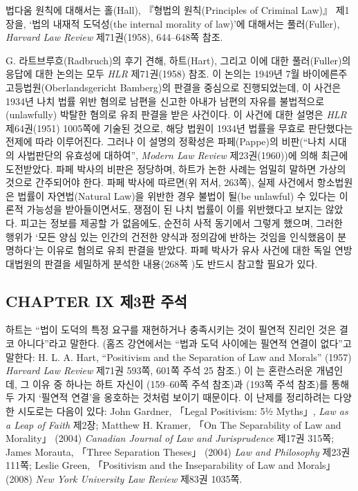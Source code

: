{
법다움 원칙에 대해서는 홀(Hall), 『형법의 원칙(Principles of Criminal
Law)』 제1장을, `법의 내재적 도덕성(the internal morality of law)'에
대해서는 풀러(Fuller), \emph{Harvard Law Review} 제71권(1958),
644--648쪽 참조.

 G.
라트브루흐(Radbruch)의 후기 견해, 하트(Hart), 그리고 이에 대한
풀러(Fuller)의 응답에 대한 논의는 모두 \emph{HLR} 제71권(1958) 참조. 이
논의는 1949년 7월 바이에른주 고등법원(Oberlandsgericht Bamberg)의 판결을
중심으로 진행되었는데, 이 사건은 1934년 나치 법률 위반 혐의로 남편을
신고한 아내가 남편의 자유를 불법적으로(unlawfully) 박탈한 혐의로 유죄 판결을 받은
사건이다. 이 사건에 대한 설명은 \emph{HLR} 제64권(1951) 1005쪽에 기술된
것으로, 해당 법원이 1934년 법률을 무효로 판단했다는 전제에 따라
이루어진다. 그러나 이 설명의 정확성은 파페(Pappe)의 비판(``나치 시대의
사법판단의 유효성에 대하여'', \emph{Modern Law Review} 제23권(1960))에
의해 최근에 도전받았다. 파페 박사의 비판은 정당하며, 하트가 논한 사례는
엄밀히 말하면 가상의 것으로 간주되어야 한다. 파페 박사에 따르면(위 저서,
263쪽), 실제 사건에서 항소법원은 법률이 자연법(Natural Law)을 위반한
경우 불법이 될(be unlawful) 수 있다는 이론적 가능성을 받아들이면서도, 쟁점이 된 나치
법률이 이를 위반했다고 보지는 않았다. 피고는 정보를 제공할
가 없음에도, 순전히 사적 동기에서 그렇게 했으며, 그러한
행위가 `모든 양심 있는 인간의 건전한 양식과 정의감에 반하는 것임을
인식했음이 분명하다'는 이유로  혐의로 유죄 판결을 받았다. 파페 박사가 유사
사건에 대한 독일 연방대법원의 판결을 세밀하게 분석한 내용(268쪽 )도 반드시 참고할 필요가 있다.

\subsection{CHAPTER IX 제3판
주석}\label{chapter-ix-uxc81c3uxd310-uxc8fcuxc11d}

 하트는 ``법이 도덕의 특정 요구를 재현하거나 충족시키는 것이
필연적 진리인 것은 결코 아니다''라고 말한다. (홈즈 강연에서는 ``법과
도덕 사이에는 필연적 연결이 없다''고 말한다: H. L. A. Hart, ``Positivism
and the Separation of Law and Morals'' (1957) \emph{Harvard Law Review}
제71권 593쪽, 601쪽 주석 25 참조.) 이 는 혼란스러운 개념인데, 그 이유 중 하나는 하트 자신이 (159--60쪽 주석 참조)과 (193쪽 주석 참조)를 통해 두 가지 `필연적
연결'을 옹호하는 것처럼 보이기 때문이다. 이 난제를 정리하려는 다양한
시도로는 다음이 있다: John Gardner, 「Legal Positivism: 5½ Myths」,
\emph{Law as a Leap of Faith} 제2장; Matthew H. Kramer, 「On The
Separability of Law and Morality」 (2004) \emph{Canadian Journal of Law
and Jurisprudence} 제17권 315쪽; James Morauta, 「Three Separation
Theses」 (2004) \emph{Law and Philosophy} 제23권 111쪽; Leslie Green,
「Positivism and the Inseparability of Law and Morals」 (2008) \emph{New
York University Law Review} 제83권 1035쪽.

}
